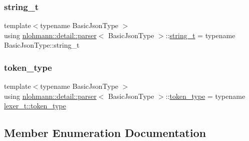 \mbox{\label{classnlohmann_1_1detail_1_1parser_af67b9b0405262c40be2b13adaab8b046}} 
\subsubsection{\texorpdfstring{string\+\_\+t}{string\_t}}
{\footnotesize\ttfamily template$<$typename Basic\+Json\+Type $>$ \\
using \hyperlink{classnlohmann_1_1detail_1_1parser}{nlohmann\+::detail\+::parser}$<$ Basic\+Json\+Type $>$\+::\hyperlink{classnlohmann_1_1detail_1_1parser_af67b9b0405262c40be2b13adaab8b046}{string\+\_\+t} =  typename Basic\+Json\+Type\+::string\+\_\+t\hspace{0.3cm}{\ttfamily [private]}}

\mbox{\label{classnlohmann_1_1detail_1_1parser_a21d247111b332785b7acf3f8e487d117}} 
\subsubsection{\texorpdfstring{token\+\_\+type}{token\_type}}
{\footnotesize\ttfamily template$<$typename Basic\+Json\+Type $>$ \\
using \hyperlink{classnlohmann_1_1detail_1_1parser}{nlohmann\+::detail\+::parser}$<$ Basic\+Json\+Type $>$\+::\hyperlink{classnlohmann_1_1detail_1_1parser_a21d247111b332785b7acf3f8e487d117}{token\+\_\+type} =  typename \hyperlink{classnlohmann_1_1detail_1_1lexer_a3f313cdbe187cababfc5e06f0b69b098}{lexer\+\_\+t\+::token\+\_\+type}\hspace{0.3cm}{\ttfamily [private]}}



\subsection{Member Enumeration Documentation}
\mbox{\label{classnlohmann_1_1detail_1_1parser_a37ac88c864dda495f72cb62776b0bebe}} 
